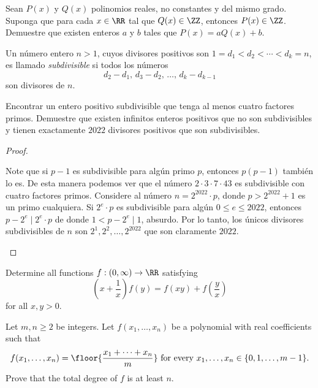 \begin{problem}
  Sean $P(x)$ y $Q(x)$ polinomios reales, no constantes y del mismo grado.
  Suponga que para cada $x\in\RR$ tal que $Q(x)\in\ZZ$, entonces $P(x)\in\ZZ$.
  Demuestre que existen enteros $a$ y $b$ tales que $P(x)=aQ(x)+b$.
\end{problem}


\begin{probEG}
  Un número entero $n>1$, cuyos divisores positivos son
  $1=d_1<d_2<\cdots<d_k=n$, es llamado \emph{subdivisible} si todos los números
  \[d_2-d_1,\,d_3-d_2,\,\dots,\,d_k-d_{k-1}\]
  son divisores de $n$.
  \begin{enumerate}[(a)]
    \ii Encontrar un entero positivo subdivisible que tenga al menos cuatro
    factores primos.
    \ii Demuestre que existen infinitos enteros positivos que no son
    subdivisibles y tienen exactamente $2022$ divisores positivos que son
    subdivisibles.
  \end{enumerate}
\end{probEG}

\begin{proof}
  \begin{enumerate}[(a)]
    \ii Note que si $p-1$ es subdivisible para algún primo $p$, entonces
    $p(p-1)$ también lo es. De esta manera podemos ver que el número
    $2\cdot 3\cdot 7\cdot 43$ es subdivisible con cuatro factores primos.
    \ii Considere al número $n=2^{2022}\cdot p$, donde $p>2^{2022}+1$ es un
    primo cualquiera. Si $2^e\cdot p$ es subdivisible para algún
    $0\le e\le 2022$, entonces $p-2^e\mid 2^e\cdot p$ de donde $1<p-2^e\mid 1$,
    absurdo. Por lo tanto, los únicos divisores subdivisibles de $n$ son
    $2^1,2^2,\dots,2^{2022}$ que son claramente $2022$.
  \end{enumerate}
\end{proof}

\note[Álgebra]{}

\begin{probEG}[ISL 2018/A5]
  Determine all functions $f:(0,\infty)\to\RR$ satisfying
  \[\left(x+\frac1x\right)f(y)=f(xy)+f\left(\frac yx\right)\]
  for all $x,y>0$.
\end{probEG}

\begin{probHR}[ISL 2018/A6]
  Let $m,n\ge 2$ be integers. Let $f(x_1,\dots,x_n)$ be a polynomial with real
  coefficients such that
  \[
    f(x_1,\dots,x_n)
    =\floor{\frac{x_1+\dots+x_n}{m}}\text{ for every }x_1,\dots,x_n\in\{0,1,\dots,m-1\}.
  \]
  Prove that the total degree of $f$ is at least $n$.
\end{probHR}

